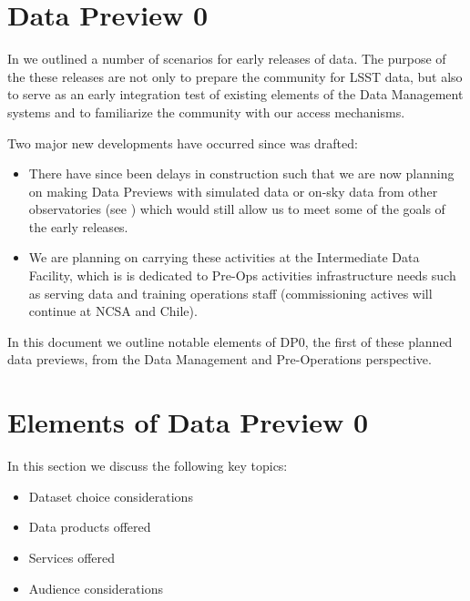 \section{Data Preview 0}\label{sec:dp0}

In  we outlined a number of scenarios for early releases of \RO data. The purpose of the these releases are not only to prepare the community for LSST data, but also to serve as an early integration test of existing elements of the Data Management systems and to familiarize the community with our access mechanisms.

Two major new developments have occurred since  was drafted:

\begin{itemize}

\item There have since been delays in construction such that we are now planning on making Data Previews with \RO simulated data or on-sky data from other observatories (see ) which would still allow us to meet some of the goals of the early releases.

\item We are planning on carrying these activities at the Intermediate Data Facility, which is is dedicated to Pre-Ops activities infrastructure needs such as serving data and training operations staff (commissioning actives will continue at NCSA and Chile).

\end{itemize}

In this document we outline notable elements of DP0, the first of these planned data previews, from the Data Management and Pre-Operations perspective.

\section{Elements of Data Preview 0}

In this section we discuss the following key topics:

\begin{itemize}

\item Dataset choice considerations

\item Data products offered

\item Services offered

\item Audience considerations

\end{itemize}

